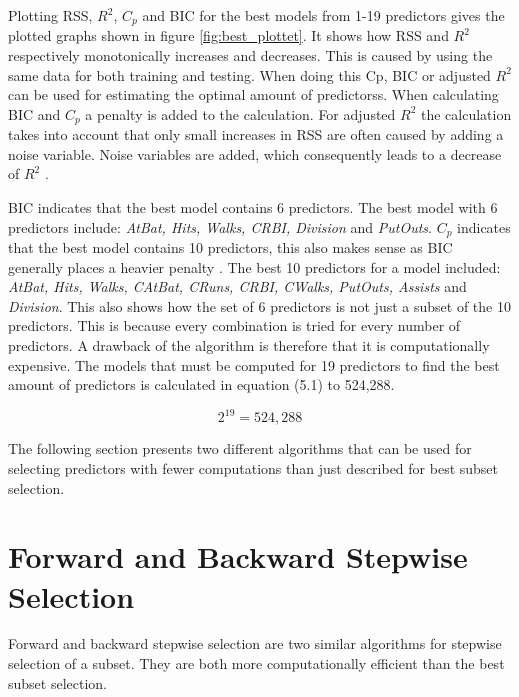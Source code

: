 Plotting RSS, $R^2$, $C_p$ and BIC for the best models from 1-19 predictors gives the plotted graphs shown in figure \ref{fig:best_plottet}. It shows how RSS and $R^2$ respectively monotonically increases and decreases. This is caused by using the same data for both training and testing. When doing this Cp, BIC or adjusted $R^2$ can be used for estimating the optimal amount of predictorss. When calculating BIC and $C_p$ a penalty is added to the calculation. For adjusted $R^2$ the calculation takes into account that only small increases in RSS are often caused by adding a noise variable. Noise variables are added, which consequently leads to a decrease of $R^2$ \citep[pp. 598]{propandstats} \citep[pp. 210-213]{ISLR}. 

\FloatBarrier


BIC indicates that the best model contains 6 predictors. The best model with 6 predictors include: \emph{AtBat, Hits, Walks, CRBI, Division} and \emph{PutOuts}. $C_p$ indicates that the best model contains 10 predictors, this also makes sense as BIC generally places a heavier penalty \citep[pp. 212]{ISLR}. The best 10 predictors for a model included: \emph{AtBat, Hits, Walks, CAtBat, CRuns, CRBI, CWalks, PutOuts, Assists} and \emph{Division}. This also shows how the set of 6 predictors is not just a subset of the 10 predictors. This is because every combination is tried for every number of predictors. A drawback of the algorithm is therefore that it is computationally expensive. The models that must be computed for 19 predictors to find the best amount of predictors is calculated in equation (5.1) to 524,288.

\begin{equation}
2^{19} = 524,288
\end{equation}

The following section presents two different algorithms that can be used for selecting predictors with fewer computations than just described for best subset selection.

\section{Forward and Backward Stepwise Selection}
Forward and backward stepwise selection are two similar algorithms for stepwise selection of a subset. They are both more computationally efficient than the best subset selection.

